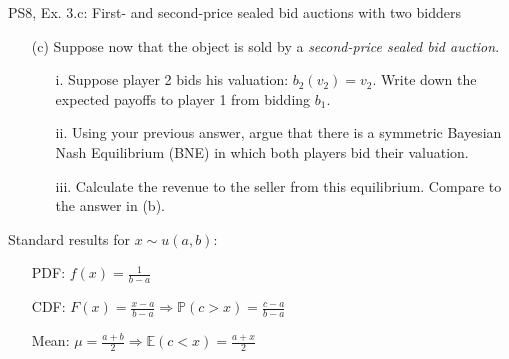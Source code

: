 \begin{frame}{PS8, Ex. 3.c: First- and second-price sealed bid auctions with two bidders}
    \begin{multicols}{2}
      \begin{itemize}
        \item[(c)] Suppose now that the object is sold by a \textit{second-price sealed bid auction}.
        \begin{itemize}\normalsize
          \item[i.]   Suppose player 2 bids his valuation: $b_2(v_2) = v_2$. Write down the expected payoffs to player 1 from bidding $b_1$.
          \item[ii.]  Using your previous answer, argue that there is a symmetric Bayesian Nash Equilibrium (BNE) in which both players bid their valuation.
          \item[iii.] Calculate the revenue to the seller from this equilibrium. Compare to the answer in (b).
        \end{itemize}
      \end{itemize}
      Standard results for $x\sim u(a, b):$
      \vspace{-6pt}
      \begin{enumerate}
        \item[PDF:] $f(x)=\frac{1}{b-a}$
        \item[CDF:] $F(x)=\frac{x-a}{b-a}\Rightarrow\mathbb{P}(c>x)=\frac{c-a}{b-a}$
        \item[Mean:] $\mu=\frac{a+b}{2}\Rightarrow\mathbb{E}(c<x)=\frac{a+x}{2}$
      \end{enumerate}
      \vfill\null\columnbreak
      \vfill\null
    \end{multicols}
\end{frame}



